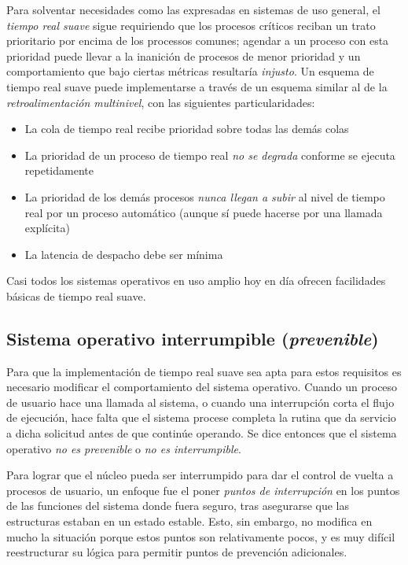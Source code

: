 \documentclass[11pt,fleqn]{book} %
\begin{document}
Para solventar necesidades como las expresadas en sistemas de uso general, el
\emph{tiempo real suave} sigue requiriendo que los procesos críticos
reciban un trato prioritario por encima de los processos comunes;
agendar a un proceso con esta prioridad puede llevar a la inanición de
procesos de menor prioridad y un comportamiento que bajo ciertas
métricas resultaría \emph{injusto}. Un esquema de tiempo real suave puede
implementarse a través de un esquema similar al de la
\emph{retroalimentación multinivel}, con las siguientes particularidades:

\begin{itemize}
\item La cola de tiempo real recibe prioridad sobre todas las demás colas
\item La prioridad de un proceso de tiempo real \emph{no se degrada} conforme
  se ejecuta repetidamente
\item La prioridad de los demás procesos \emph{nunca llegan a subir} al nivel
  de tiempo real por un proceso automático (aunque sí puede hacerse
  por una llamada explícita)
\item La latencia de despacho debe ser mínima
\end{itemize}

Casi todos los sistemas operativos en uso amplio hoy en día ofrecen
facilidades básicas de tiempo real suave.
\subsection{Sistema operativo interrumpible (\emph{prevenible})}
\label{sec-4-5-2}


Para que la implementación de tiempo real suave sea apta para estos
requisitos es necesario modificar el comportamiento del sistema
operativo. Cuando un proceso de usuario hace una llamada al sistema, o
cuando una interrupción corta el flujo de ejecución, hace falta que el
sistema procese completa la rutina que da servicio a dicha solicitud
antes de que continúe operando. Se dice entonces que el sistema
operativo \emph{no es prevenible} o \emph{no es interrumpible}.

Para lograr que el núcleo pueda ser interrumpido para dar el control
de vuelta a procesos de usuario, un enfoque fue el poner \emph{puntos de interrupción} en los puntos de las funciones del sistema donde fuera
seguro, tras asegurarse que las estructuras estaban en un estado
estable. Esto, sin embargo, no modifica en mucho la situación porque
estos puntos son relativamente pocos, y es muy difícil reestructurar
su lógica para permitir puntos de prevención adicionales.
\end{document}
